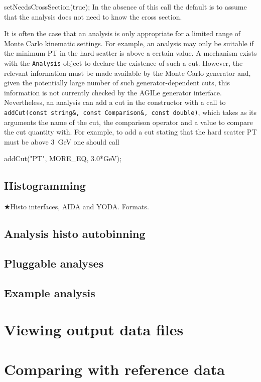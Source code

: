 \documentclass{JHEP3}
\DeclareRobustCommand{\TODO}[1]{\ensuremath{\bigstar}{#1}\xspace}
\newenvironment{snippet}{\Verbatim}{\endVerbatim}
\newcommand{\code}[1]{\texttt{#1}\xspace}
\begin{document}
\begin{snippet}
  setNeedsCrossSection(true);
\end{snippet}
\noindent In the absence of  this call the default is to assume that the analysis does not need to know the cross section.  

It is often the case that an analysis is only appropriate for a limited range of Monte Carlo kinematic settings.  For example, an analysis may only be suitable if the minimum PT in the hard scatter is above a certain value.  A mechanism exists with the \code{Analysis} object to declare the existence of such a cut.  However, the relevant information must be made available by the Monte Carlo generator and, given the potentially large number of such generator-dependent cuts, this information is not currently checked by the AGILe generator interface.  Nevertheless, an analysis can add a cut in the constructor with a call to \code{addCut(const string\&, const Comparison\&, const double)}, which takes as its arguments the name of the cut, the comparison operator and a value to compare the cut quantity with.  For example, to add a cut stating that the hard scatter PT must be above $3$~GeV one should call

\begin{snippet}
  addCut("PT", MORE_EQ, 3.0*GeV);
\end{snippet}



\subsection{Histogramming}
\TODO{Histo interfaces, AIDA and YODA. Formats.}

\subsection{Analysis histo autobinning}
\subsection{Pluggable analyses}
\subsection{Example analysis}

\section{Viewing output data files}

\section{Comparing with reference data}


\end{document}

